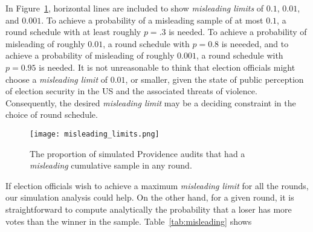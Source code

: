 In Figure~\ref{fig:misleading}, horizontal lines are included to show \emph{misleading limits} of $0.1$, $0.01$, and $0.001$.
To achieve a probability of a misleading sample of at most $0.1$, a round schedule with at least roughly $p=.3$ is needed.
To achieve a probability of misleading of roughly $0.01$, a round schedule with $p=0.8$ is neeeded, and to achieve a probability of misleading of roughly $0.001$, a round schedule with $p=0.95$ is needed.
It is not unreasonable to think that election officials might choose a \emph{misleading limit} of $0.01$, or smaller, given the state of public perception of election security in the US and the associated threats of violence.
Consequently, the desired \emph{misleading limit} may be a deciding constraint in the choice of round schedule. 

\begin{figure}
\texttt{[image: misleading\_limits.png]}
\caption{The proportion of simulated Providence audits that had a \emph{misleading} cumulative sample in any round.}
\label{fig:misleading}
\end{figure}


If election officials wish to achieve a maximum \emph{misleading limit} for all the rounds, our simulation analysis could help. On the other hand, for a given round, it is straightforward to compute analytically the probability that a loser has more votes than the winner in the sample. Table~\ref{tab:misleading} shows

